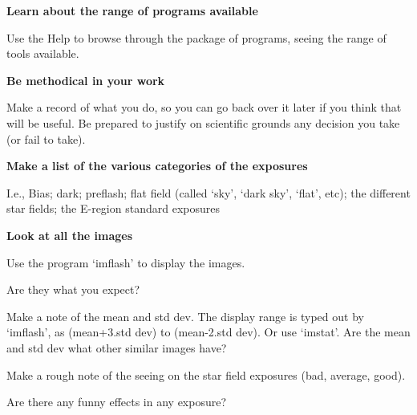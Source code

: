 \begin{small}
{{{\hspace*{4ex} \bf   Learn about the range of programs available}
 
 Use the Help to browse through the \starman package
 of programs, seeing the range of tools available.
 
{\hspace*{4ex} \bf   Be methodical in your work}
 
 Make a record of what you do, so you can go back over it later if you
 think that will be useful. Be prepared to justify on scientific grounds
 any decision you take (or fail to take).
 
{\hspace*{4ex} \bf   Make a list of the various categories of the exposures}
 
 I.e., Bias; dark; preflash; flat field (called `sky', `dark sky',
 `flat', etc); the different star fields; the E-region standard
 exposures
 
{\hspace*{4ex} \bf   Look at all the images}
 
 Use the \starman program `imflash' to display the images.
 
 Are they what you expect?
 
 Make a note of the mean and std dev. The display range is typed
 out by `imflash', as (mean+3.std dev) to (mean-2.std dev). Or use
 `imstat'. Are the mean and std dev what other similar images have?
 
 Make a rough note of the seeing on the star field exposures
 (bad, average, good).
 
 Are there any funny effects in any exposure?
 
}}
\end{small}
